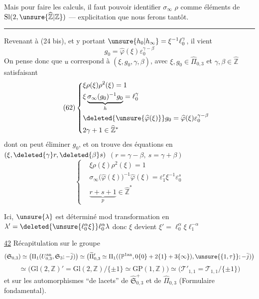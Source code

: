 

Mais pour faire les calculs, il faut pouvoir identifier $\sigma_\infty$
 $\rho$ comme éléments de
$\mathrm{Sl}(2,\unsure{\widehat{\mathbb Z}|\mathbb Z})$
--- explicitation que nous ferons tantôt.

\begin{center}\rule{2cm}{0.4pt}\end{center}

Revenant à (24 bis), et y portant
$\unsure{h_0|h_\infty}=\xi^{-1}\ell_0^{\gamma}$, il vient
\[
\tag{61}
g_0=\widehat{\varphi}(\xi)
\varepsilon_0^{\gamma-\beta}
\]
On pense donc que $u$ correspond à
$(\xi,g_0,\gamma,\beta)$,
avec $\xi,g_0\in\widehat{\Pi}_{0,3}$
et $\gamma,\beta\in\widehat{\mathbb Z}$
satisfaisant
\[
\tag{62}
\left\{
\begin{aligned}
&\xi\rho(\xi)\rho^2(\xi)=1\\
&\xi\underbrace{\sigma_\infty(g_0)^{-1}g_0}_{h}
=\ell_0^{\gamma}\\
&\deleted{\unsure{\widehat{\varphi}(\xi)}}g_0
=\widehat{\varphi}(\xi)
\varepsilon_0^{\gamma-\beta}\\
&2\gamma+1\in\widehat{\mathbb Z}^{*}
\end{aligned}
\right.
\]
dont on peut éliminer $g_0$, et on trouve des équations en
$(\xi,\deleted{\gamma}r,\deleted{\beta}s)$
$(r=\gamma-\beta,\ s=\gamma+\beta)$
\[
\tag{63}
\left\{
\begin{aligned}
&\xi\rho(\xi)\rho^2(\xi)=1\\
&\sigma_\infty\bigl(\widehat{\varphi}(\xi)\bigr)^{-1}
\widehat{\varphi}(\xi)
=\varepsilon_1^r\xi^{-1}\varepsilon_0^s\\
&\underbrace{r+s+1}_{p}\in\widehat{\mathbb Z}^{*}
\end{aligned}
\right.
\]

Ici, $\unsure{\lambda}$ est déterminé mod transformation en
$\lambda'=\deleted{\unsure{\ell_0^{\alpha}\xi}}\ell_0^\alpha\lambda$
donc $\xi$ devient
$\xi'=\ell_0^\alpha\xi\ell_1^{-\alpha}$



\uline{42} Récapitulation sur le groupe
\[
(\mathfrak S_{0,3})
\simeq
\bigl(\Pi_1(U_{0,3}^{\mathrm{an}},\mathfrak S_3;-\bar j)\bigr)
\simeq
\bigl(\widetilde\Pi'_{0,3}\simeq
\Pi_1((\mathbb P^{1\mathrm{an}},0\{0\}+2\{1\}+3\{\infty\}),\unsure{\{1,\tau\}};-\bar j)\bigr)
\]
\[
\simeq\bigl(\mathrm{Gl}(2,\mathbb Z)'=\mathrm{Gl}(2,\mathbb Z)/\{\pm1\}
\simeq\mathrm{GP}(1,\mathbb Z)\bigr)
\simeq\bigl(\mathcal T'_{1,1}=\mathcal T_{1,1}/\{\pm1\}\bigr)
\]
et sur les automorphismes ``de lacets'' de
$\widehat{\mathfrak S}_{0,3}^{+}$ et de
$\widehat\Pi_{0,3}$ (Formulaire fondamental).

